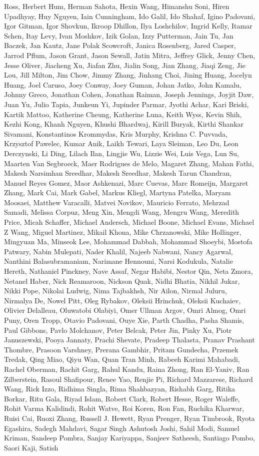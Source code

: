 Ross, Herbert Hum, Herman Sahota, Hexin Wang, Himanshu Soni, Hiren Upadhyay, Huy Nguyen, Iain Cunningham, Ido Galil, Ido Shahaf, Igino Padovani, Igor Gitman, Igor Shovkun, Ikroop Dhillon, Ilya Loshchilov, Ingrid Kelly, Itamar Schen, Itay Levy, Ivan Moshkov, Izik Golan, Izzy Putterman, Jain Tu, Jan Baczek, Jan Kautz, Jane Polak Scowcroft, Janica Rosenberg, Jared Casper, Jarrod Pflum, Jason Grant, Jason Sewall, Jatin Mitra, Jeffrey Glick, Jenny Chen, Jesse Oliver, Jiacheng Xu, Jiafan Zhu, Jialin Song, Jian Zhang, Jiaqi Zeng, Jie Lou, Jill Milton, Jim Chow, Jimmy Zhang, Jinhang Choi, Jining Huang, Jocelyn Huang, Joel Caruso, Joey Conway, Joey Guman, Johan Jatko, John Kamalu, Johnny Greco, Jonathan Cohen, Jonathan Raiman, Joseph Jennings, Joyjit Daw, Juan Yu, Julio Tapia, Junkeun Yi, Jupinder Parmar, Jyothi Achar, Kari Briski, Kartik Mattoo, Katherine Cheung, Katherine Luna, Keith Wyss, Kevin Shih, Kezhi Kong, Khanh Nguyen, Khushi Bhardwaj, Kirill Buryak, Kirthi Shankar Sivamani, Konstantinos Krommydas, Kris Murphy, Krishna C. Puvvada, Krzysztof Pawelec, Kumar Anik, Laikh Tewari, Laya Sleiman, Leo Du, Leon Derczynski, Li Ding, Lilach Ilan, Lingjie Wu, Lizzie Wei, Luis Vega, Lun Su, Maarten Van Segbroeck, Maer Rodrigues de Melo, Magaret Zhang, Mahan Fathi, Makesh Narsimhan Sreedhar, Makesh Sreedhar, Makesh Tarun Chandran, Manuel Reyes Gomez, Maor Ashkenazi, Marc Cuevas, Marc Romeijn, Margaret Zhang, Mark Cai, Mark Gabel, Markus Kliegl, Martyna Patelka, Maryam Moosaei, Matthew Varacalli, Matvei Novikov, Mauricio Ferrato, Mehrzad Samadi, Melissa Corpuz, Meng Xin, Mengdi Wang, Mengru Wang, Meredith Price, Micah Schaffer, Michael Andersch, Michael Boone, Michael Evans, Michael Z Wang, Miguel Martinez, Mikail Khona, Mike Chrzanowski, Mike Hollinger, Mingyuan Ma, Minseok Lee, Mohammad Dabbah, Mohammad Shoeybi, Mostofa Patwary, Nabin Mulepati, Nader Khalil, Najeeb Nabwani, Nancy Agarwal, Nanthini Balasubramaniam, Narimane Hennouni, Narsi Kodukula, Natalie Hereth, Nathaniel Pinckney, Nave Assaf, Negar Habibi, Nestor Qin, Neta Zmora, Netanel Haber, Nick Reamaroon, Nickson Quak, Nidhi Bhatia, Nikhil Jukar, Nikki Pope, Nikolai Ludwig, Nima Tajbakhsh, Nir Ailon, Nirmal Juluru, Nirmalya De, Nowel Pitt, Oleg Rybakov, Oleksii Hrinchuk, Oleksii Kuchaiev, Olivier Delalleau, Oluwatobi Olabiyi, Omer Ullman Argov, Omri Almog, Omri Puny, Oren Tropp, Otavio Padovani, Ouye Xie, Parth Chadha, Pasha Shamis, Paul Gibbons, Pavlo Molchanov, Peter Belcak, Peter Jin, Pinky Xu, Piotr Januszewski, Pooya Jannaty, Prachi Shevate, Pradeep Thalasta, Pranav Prashant Thombre, Prasoon Varshney, Prerana Gambhir, Pritam Gundecha, Przemek Tredak, Qing Miao, Qiyu Wan, Quan Tran Minh, Rabeeh Karimi Mahabadi, Rachel Oberman, Rachit Garg, Rahul Kandu, Raina Zhong, Ran El-Yaniv, Ran Zilberstein, Rasoul Shafipour, Renee Yao, Renjie Pi, Richard Mazzarese, Richard Wang, Rick Izzo, Ridhima Singla, Rima Shahbazyan, Rishabh Garg, Ritika Borkar, Ritu Gala, Riyad Islam, Robert Clark, Robert Hesse, Roger Waleffe, Rohit Varma Kalidindi, Rohit Watve, Roi Koren, Ron Fan, Ruchika Kharwar, Ruisi Cai, Ruoxi Zhang, Russell J. Hewett, Ryan Prenger, Ryan Timbrook, Ryota Egashira, Sadegh Mahdavi, Sagar Singh Ashutosh Joshi, Sahil Modi, Samuel Kriman, Sandeep Pombra, Sanjay Kariyappa, Sanjeev Satheesh, Santiago Pombo, Saori Kaji, Satish 